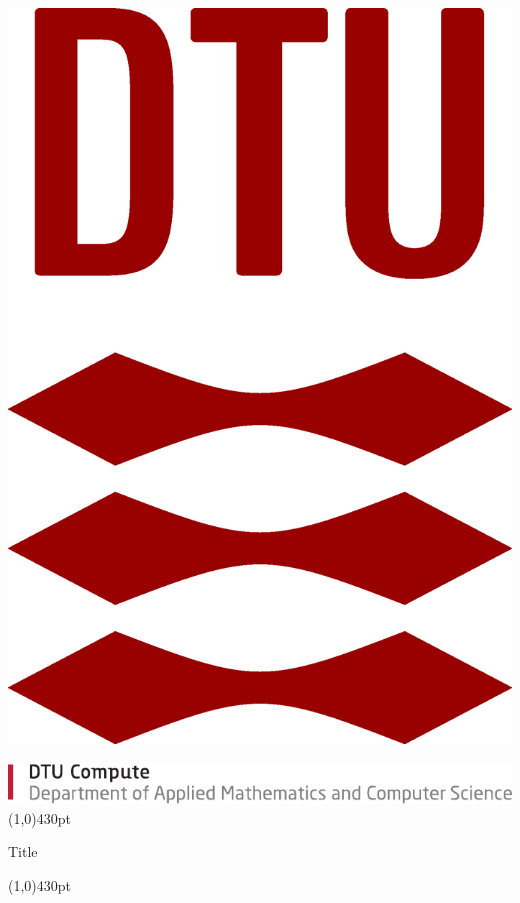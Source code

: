 \begin{titlepage}

\begin{flushright}
    \includegraphics[scale = 0.1]{Illustrations/Corp_Red_RGB.eps}
\end{flushright}

\vspace*{\fill}
\includegraphics[scale = 1.3]{Illustrations/DTU-Compute-B-UK.pdf} \newline
\line(1,0){430pt}
\begin{center}
    \Huge{\sffamily Title} 
\end{center}
\line(1,0){430pt}



\end{titlepage}

